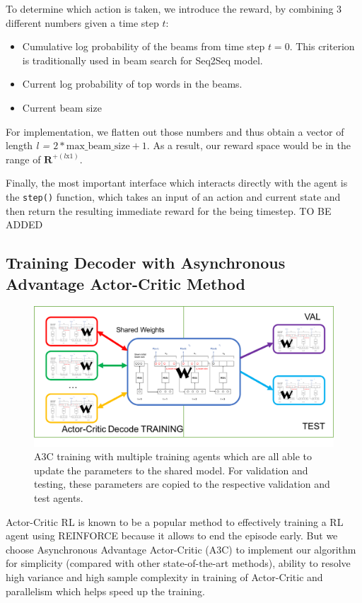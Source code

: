 \documentclass[11pt,a4paper]{article}
\begin{document}
To determine which action is taken, we introduce the reward, by combining 3 different numbers given a time step $t$: 
\begin{itemize}
	\item Cumulative log probability of the beams from time step $t=0$. This criterion is traditionally used in beam search for Seq2Seq model. 
    \item Current log probability of top words in the beams. 
    \item Current beam size 
\end{itemize}

For implementation, we flatten out those numbers and thus obtain a vector of length \textit{l = $2 * \text{max\_beam\_size} + 1$}. As a result, our reward space would be in the range of $\mathbf{R}^{+(l \text{x} 1)}$.

Finally, the most important interface which interacts directly with the agent is the \texttt{step()} function, which takes an input of an action and current state and then return the resulting immediate reward for the being timestep. 
TO BE ADDED 

\subsection{Training Decoder with Asynchronous Advantage Actor-Critic Method}


\begin{figure}[ht]
\centering
\includegraphics[width=1.0\linewidth]{a3c.png}
\caption{A3C training with multiple training agents which are all able to update the parameters to the shared model. For validation and testing, these parameters are copied to the respective validation and test agents.}
\label{fig:a3c}
\end{figure}

Actor-Critic RL \cite{sutton1998reinforcement} is known to be a popular method to effectively training a RL agent using REINFORCE \cite{williams1992simple} because it allows to end the episode early. But we choose Asynchronous Advantage Actor-Critic (A3C) \cite{mnih2016asynchronous} to implement our algorithm for simplicity (compared with other state-of-the-art methods), ability to resolve high variance and high sample complexity in training of Actor-Critic and parallelism which helps speed up the training. 
\end{document}
